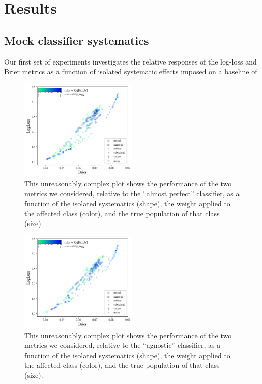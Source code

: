 \section{Results}
\label{sec:results}

\subsection{Mock classifier systematics}
\label{sec:mockresults}

Our first set of experiments investigates the relative responses of the log-loss and Brier metrics as a function of isolated systematic effects imposed on a baseline of

\begin{figure}
	\begin{center}
		\includegraphics[width=0.5\textwidth]{./fig/almostall_effects_isolated.png}
		\caption{This unreasonably complex plot shows the performance of the two metrics we considered, relative to the ``almost perfect'' classifier, as a function of the isolated systematics (shape), the weight applied to the affected class (color), and the true population of that class (size).}
		\label{fig:plasticc_all_almost}
	\end{center}
\end{figure}

\begin{figure}
	\begin{center}
		\includegraphics[width=0.5\textwidth]{./fig/agnosticall_effects_isolated.png}
		\caption{This unreasonably complex plot shows the performance of the two metrics we considered, relative to the ``agnostic'' classifier, as a function of the isolated systematics (shape), the weight applied to the affected class (color), and the true population of that class (size).}
		\label{fig:plasticc_all_agnostic}
	\end{center}
\end{figure}

